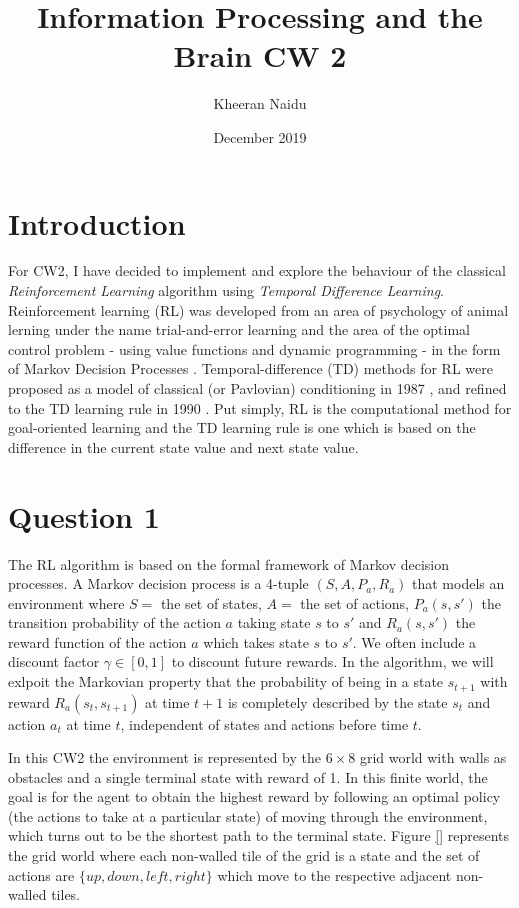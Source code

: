 \documentclass[10pt, a4paper]{article}
\title{Information Processing and the Brain CW 2}
\author{Kheeran Naidu}
\date{December 2019}
\begin{document}
\maketitle

\section*{Introduction}
For CW2, I have decided to implement and explore the behaviour of the classical \textit{Reinforcement Learning} algorithm using \textit{Temporal Difference Learning}. Reinforcement learning (RL) was developed from an area of psychology of animal lerning under the name trial-and-error learning \cite{woodworth1937experimental} and the area of the optimal control problem - using value functions and dynamic programming - in the form of Markov Decision Processes \cite{bellman1957markov}\cite{bellman1957dynamic}. Temporal-difference (TD) methods for RL were proposed as a model of classical (or Pavlovian) conditioning in 1987 \cite{sutton1987temporal}, and refined to the TD learning rule in 1990 \cite{sutton1990time}. Put simply, RL is the computational method for goal-oriented learning and the TD learning rule is one which is based on the difference in the current state value and next state value.

\section*{Question 1}
The RL algorithm is based on the formal framework of Markov decision processes. A Markov decision process is a 4-tuple $(S,A,P_a, R_a)$ that models an environment where $S =$ the set of states, $A =$ the set of actions, $P_a(s,s')$ the transition probability of the action $a$ taking state $s$ to $s'$ and $R_a(s,s')$ the reward function of the action $a$ which takes state $s$ to $s'$. We often include a discount factor $\gamma \in [0,1]$ to discount future rewards. In the algorithm, we will exlpoit the Markovian property that the probability of being in a state $s_{t+1}$ with reward $R_a(s_t, s_{t+1})$ at time $t+1$ is completely described by the state $s_t$ and action $a_t$ at time $t$, independent of states and actions before time $t$.

In this CW2 the environment is represented by the $6 \times 8$ grid world with walls as obstacles and a single terminal state with reward of 1. In this finite world, the goal is for the agent to obtain the highest reward by following an optimal policy (the actions to take at a particular state) of moving through the environment, which turns out to be the shortest path to the terminal state. Figure \ref{} represents the grid world where each non-walled tile of the grid is a state and the set of actions are $\{up, down, left, right\}$ which move to the respective adjacent non-walled tiles.
\end{document}
